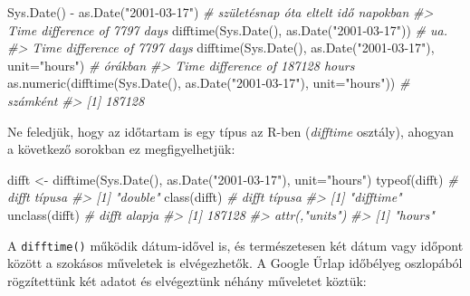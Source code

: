 \documentclass[
]{book}
\newenvironment{Shaded}{\begin{snugshade}}{\end{snugshade}}
\newcommand{\AttributeTok}[1]{\textcolor[rgb]{0.77,0.63,0.00}{#1}}
\newcommand{\CommentTok}[1]{\textcolor[rgb]{0.56,0.35,0.01}{\textit{#1}}}
\newcommand{\FunctionTok}[1]{\textcolor[rgb]{0.00,0.00,0.00}{#1}}
\newcommand{\NormalTok}[1]{#1}
\newcommand{\OtherTok}[1]{\textcolor[rgb]{0.56,0.35,0.01}{#1}}
\newcommand{\SpecialCharTok}[1]{\textcolor[rgb]{0.00,0.00,0.00}{#1}}
\newcommand{\StringTok}[1]{\textcolor[rgb]{0.31,0.60,0.02}{#1}}
\begin{document}
\begin{Shaded}
\begin{Highlighting}[]
\FunctionTok{Sys.Date}\NormalTok{() }\SpecialCharTok{{-}} \FunctionTok{as.Date}\NormalTok{(}\StringTok{"2001{-}03{-}17"}\NormalTok{)          }\CommentTok{\# születésnap óta eltelt idő napokban}
\CommentTok{\#\textgreater{} Time difference of 7797 days}
\FunctionTok{difftime}\NormalTok{(}\FunctionTok{Sys.Date}\NormalTok{(), }\FunctionTok{as.Date}\NormalTok{(}\StringTok{"2001{-}03{-}17"}\NormalTok{)) }\CommentTok{\# ua.}
\CommentTok{\#\textgreater{} Time difference of 7797 days}
\FunctionTok{difftime}\NormalTok{(}\FunctionTok{Sys.Date}\NormalTok{(), }\FunctionTok{as.Date}\NormalTok{(}\StringTok{"2001{-}03{-}17"}\NormalTok{), }\AttributeTok{unit=}\StringTok{"hours"}\NormalTok{) }\CommentTok{\# órákban}
\CommentTok{\#\textgreater{} Time difference of 187128 hours}
\FunctionTok{as.numeric}\NormalTok{(}\FunctionTok{difftime}\NormalTok{(}\FunctionTok{Sys.Date}\NormalTok{(), }\FunctionTok{as.Date}\NormalTok{(}\StringTok{"2001{-}03{-}17"}\NormalTok{), }\AttributeTok{unit=}\StringTok{"hours"}\NormalTok{)) }\CommentTok{\# számként}
\CommentTok{\#\textgreater{} [1] 187128}
\end{Highlighting}
\end{Shaded}

Ne feledjük, hogy az időtartam is egy típus az R-ben (\emph{difftime} osztály), ahogyan a következő sorokban ez megfigyelhetjük:

\begin{Shaded}
\begin{Highlighting}[]
\NormalTok{difft }\OtherTok{\textless{}{-}} \FunctionTok{difftime}\NormalTok{(}\FunctionTok{Sys.Date}\NormalTok{(), }\FunctionTok{as.Date}\NormalTok{(}\StringTok{"2001{-}03{-}17"}\NormalTok{), }\AttributeTok{unit=}\StringTok{"hours"}\NormalTok{)}
\FunctionTok{typeof}\NormalTok{(difft)   }\CommentTok{\# difft típusa}
\CommentTok{\#\textgreater{} [1] "double"}
\FunctionTok{class}\NormalTok{(difft)    }\CommentTok{\# difft típusa}
\CommentTok{\#\textgreater{} [1] "difftime"}
\FunctionTok{unclass}\NormalTok{(difft)  }\CommentTok{\# difft alapja}
\CommentTok{\#\textgreater{} [1] 187128}
\CommentTok{\#\textgreater{} attr(,"units")}
\CommentTok{\#\textgreater{} [1] "hours"}
\end{Highlighting}
\end{Shaded}

A \texttt{difftime()} működik dátum-idővel is, és természetesen két dátum vagy időpont között a szokásos műveletek is elvégezhetők. A Google Űrlap időbélyeg oszlopából rögzítettünk két adatot és elvégeztünk néhány műveletet köztük:
\end{document}
